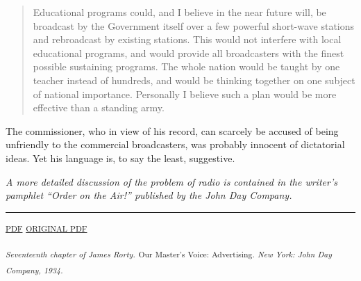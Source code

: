 \begin{quote}
Educational programs could, and I believe in the near future will, be
broadcast by the Government itself over a few powerful short-wave
stations and rebroadcast by existing stations. This would not interfere
with local educational programs, and would provide all broadcasters with
the finest possible sustaining programs. The whole nation would be
taught by one teacher instead of hundreds, and would be thinking
together on one subject of national importance. Personally I believe
such a plan would be more effective than a standing army.
\end{quote}

The commissioner, who in view of his record, can scarcely be accused of
being unfriendly to the commercial broadcasters, was probably innocent
of dictatorial ideas. Yet his language is, to say the least, suggestive.

\emph{A more detailed discussion of the problem of radio is contained in
the writer's pamphlet ``Order on the Air!'' published by the John Day
Company.}

\begin{center}\rule{0.5\linewidth}{\linethickness}\end{center}

\textsuperscript{\href{https://github.com/mediastudiespress/singles/raw/master/public_domain/rorty-1934/pdfs/21-rorty-1934-chapter-seventeen-msp.pdf}{PDF}}
\textsuperscript{\textbar{}}
\textsuperscript{\href{https://github.com/mediastudiespress/singles/raw/master/public_domain/rorty-1934/pdfs/21-rorty-1934-chapter-seventeen-original.pdf}{ORIGINAL
PDF}}

\textsuperscript{\emph{Seventeenth chapter of James Rorty.}}
\textsuperscript{Our Master's Voice: Advertising\emph{. New York: John
Day Company, 1934.}}
